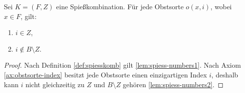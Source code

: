\begin{lemma} \label{lem:spiess-numbers}
Sei $K = (F, Z)$ eine Spießkombination. Für jede Obstsorte $o(x, i)$, wobei $x \in F$, gilt:
\begin{enumerate}[label={\upshape(\roman*)}]
  \item $i \in Z$, \label{lem:spiess-numbers1}
  \item $i \notin B \setminus Z$. \label{lem:spiess-numbers2}
\end{enumerate}   
\end{lemma}

\begin{proof}
Nach Definition \ref{def:spiesskomb} gilt \ref{lem:spiess-numbers1}. 
Nach Axiom \ref{ax:obstsorte-index} besitzt jede Obstsorte einen einzigartigen Index $i$,
deshalb kann $i$ nicht gleichzeitig zu $Z$ und $B \setminus Z$ gehören \ref{lem:spiess-numbers2}.
\end{proof}